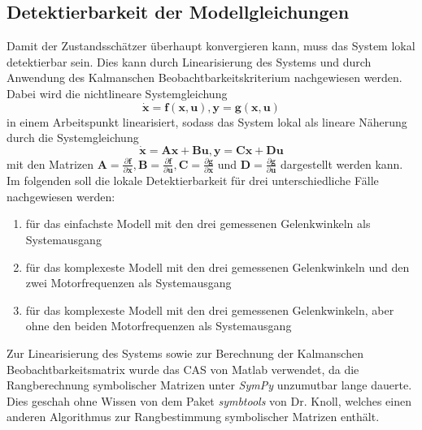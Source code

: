 \documentclass[times, 9pt,twocolumn]{article}
\begin{document}
	\subsection{Detektierbarkeit der Modellgleichungen}
	Damit der Zustandsschätzer überhaupt konvergieren kann, muss das System lokal detektierbar sein. Dies kann durch Linearisierung des Systems und durch Anwendung des Kalmanschen Beobachtbarkeitskriterium nachgewiesen werden. Dabei wird die nichtlineare Systemgleichung  $$ \bm{\dot x} = \bm{f}(\bm{x},\bm{u}), \bm y = \bm{g}(\bm{x}, \bm u) $$ in einem Arbeitspunkt linearisiert, sodass das System lokal als lineare Näherung durch die Systemgleichung $$ \bm{\dot x} = \bm{A} \bm{x} + \bm{B} \bm{u}, \bm y = \bm C \bm x + \bm D \bm u $$ mit den Matrizen $ \bm A = \frac{\partial{ \bm f}}{\partial{\bm x}}, \bm B = \frac{\partial{ \bm f}}{\partial{\bm u}} , \bm C = \frac{\partial{ \bm g}}{\partial{\bm x}}$ und $\bm D = \frac{\partial{ \bm g}}{\partial{\bm u}}$ dargestellt werden kann. Im folgenden soll die lokale Detektierbarkeit für drei unterschiedliche Fälle nachgewiesen werden:
	\begin{enumerate}
		\item für das einfachste Modell mit den drei gemessenen Gelenkwinkeln als Systemausgang
		\item für das komplexeste Modell mit den drei gemessenen Gelenkwinkeln und den zwei Motorfrequenzen als Systemausgang
		\item für das komplexeste Modell mit den drei gemessenen Gelenkwinkeln, aber ohne den beiden Motorfrequenzen als Systemausgang
	\end{enumerate}
	Zur Linearisierung des Systems sowie zur Berechnung der Kalmanschen Beobachtbarkeitsmatrix wurde das CAS von Matlab verwendet, da die Rangberechnung symbolischer Matrizen unter \textit{SymPy} unzumutbar lange dauerte. Dies geschah ohne Wissen von dem Paket \textit{symbtools} von Dr. Knoll, welches einen anderen Algorithmus zur Rangbestimmung symbolischer Matrizen enthält. 
\end{document}

